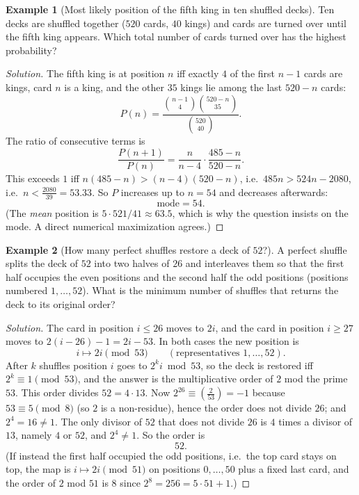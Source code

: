 \documentclass[11pt]{article}
\theoremstyle{definition}
\newtheorem{example}{Example}[section]
\begin{document}
\begin{example}[Most likely position of the fifth king in ten shuffled decks]
Ten decks are shuffled together ($520$ cards, $40$ kings) and cards are turned over until the fifth king appears. Which total number of cards turned over has the highest probability?
\end{example}

\begin{proof}[Solution]
The fifth king is at position $n$ iff exactly $4$ of the first $n-1$ cards are kings, card $n$ is a king, and the other $35$ kings lie among the last $520-n$ cards:
\[
P(n)=\frac{\binom{n-1}4\binom{520-n}{35}}{\binom{520}{40}}.
\]
The ratio of consecutive terms is
\[
\frac{P(n+1)}{P(n)}=\frac{n}{n-4}\cdot\frac{485-n}{520-n}.
\]
This exceeds $1$ iff $n(485-n)>(n-4)(520-n)$, i.e.\ $485n>524n-2080$, i.e.\ $n<\tfrac{2080}{39}=53.33$. So $P$ increases up to $n=54$ and decreases afterwards:
\[
\boxed{\text{mode}=54}.
\]
(The \emph{mean} position is $5\cdot521/41\approx63.5$, which is why the question insists on the mode. A direct numerical maximization agrees.)
\end{proof}

\begin{example}[How many perfect shuffles restore a deck of $52$?]
A perfect shuffle splits the deck of $52$ into two halves of $26$ and interleaves them so that the first half occupies the even positions and the second half the odd positions (positions numbered $1,\dots,52$). What is the minimum number of shuffles that returns the deck to its original order?
\end{example}

\begin{proof}[Solution]
The card in position $i\le26$ moves to $2i$, and the card in position $i\ge27$ moves to $2(i-26)-1=2i-53$. In both cases the new position is
\[
i\mapsto 2i \pmod{53}\qquad(\text{representatives }1,\dots,52).
\]
After $k$ shuffles position $i$ goes to $2^ki\bmod 53$, so the deck is restored iff $2^k\equiv1\pmod{53}$, and the answer is the multiplicative order of $2$ mod the prime $53$. This order divides $52=4\cdot13$. Now $2^{26}\equiv\left(\tfrac2{53}\right)=-1$ because $53\equiv5\pmod 8$ (so $2$ is a non-residue), hence the order does not divide $26$; and $2^4=16\ne1$. The only divisor of $52$ that does not divide $26$ is $4$ times a divisor of $13$, namely $4$ or $52$, and $2^4\ne1$. So the order is
\[
\boxed{52}.
\]
(If instead the first half occupied the odd positions, i.e.\ the top card stays on top, the map is $i\mapsto2i\pmod{51}$ on positions $0,\dots,50$ plus a fixed last card, and the order of $2$ mod $51$ is $8$ since $2^8=256=5\cdot51+1$.)
\end{proof}
\end{document}
